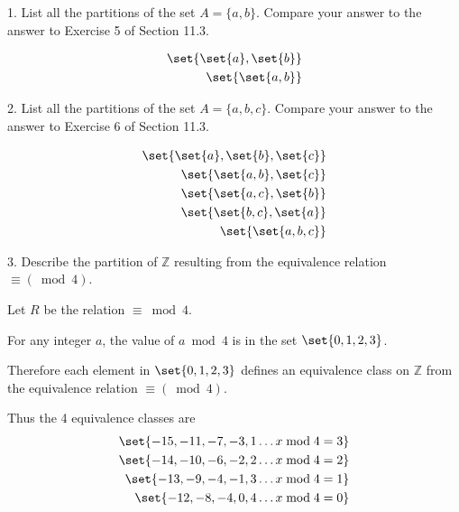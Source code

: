 \documentclass{hippoidC}
\begin{document}
\toc
\thispagestyle{styleTOC}
\pagebreak
\pagestyle{styleE}

\begin{prooflist}{1. List all the partitions of the set $A=\{a, b\}$. Compare your answer to the answer to Exercise 5 of Section 11.3.}
	\item
	\begin{align*}
		\set{\set{a}, \set{b}} \\
		\set{\set{a, b}}
	\end{align*}
\end{prooflist}

\begin{prooflist}{2. List all the partitions of the set $A=\{a, b, c\}$. Compare
		your answer to the answer to Exercise 6 of Section 11.3.}
	\item
	\begin{align*}
		\set{\set{a}, \set{b}, \set{c}} \\
		\set{\set{a, b}, \set{c}}       \\
		\set{\set{a, c}, \set{b}}       \\
		\set{\set{b, c}, \set{a}}       \\
		\set{\set{a, b, c}}
	\end{align*}
\end{prooflist}

\begin{prooflist}{3. Describe the partition of $\mathbb{Z}$ resulting from the equivalence relation $\equiv(\bmod 4)$.}
	\item Let $R$ be the relation $\equiv\bmod 4$.
	\item For any integer $a$, the value of $a\bmod 4$ is in the set $\set{0, 1, 2, 3}$.
	\item Therefore each element in $\set{0, 1, 2, 3}$ defines an equivalence class
	on $\mathbb{Z}$ from the equivalence relation $\equiv(\bmod 4)$.
	\item Thus the 4 equivalence classes are
	\begin{align*}
		\set{-15, -11, -7, -3, 1 \dots x\bmod4=3} \\
		\set{-14, -10, -6, -2, 2 \dots x\bmod4=2} \\
		\set{-13, -9, -4, -1, 3 \dots x\bmod4=1}  \\
		\set{-12, -8, -4, 0, 4 \dots x\bmod4=0}   \\
	\end{align*}

\end{prooflist}
\end{document}
